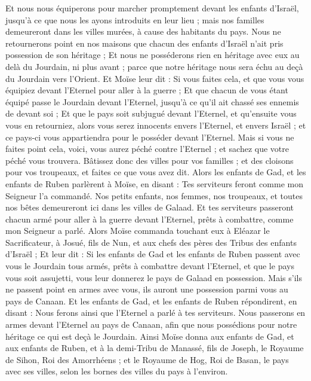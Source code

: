 \begin{multicols}{2}
Et nous nous équiperons pour marcher promptement devant les enfants d'Israël, jusqu'à ce que nous les ayons introduits en leur lieu ; mais nos familles demeureront dans les villes murées, à cause des habitants du pays.
Nous ne retournerons point en nos maisons que chacun des enfants d'Israël n'ait pris possession de son héritage ;
Et nous ne posséderons rien en héritage avec eux au delà du Jourdain, ni plus avant ; parce que notre héritage nous sera échu au deçà du Jourdain vers l'Orient.
Et Moïse leur dit : Si vous faites cela, et que vous vous équipiez devant l'Eternel pour aller à la guerre ;
Et que chacun de vous étant équipé passe le Jourdain devant l'Eternel, jusqu'à ce qu'il ait chassé ses ennemis de devant soi ;
Et que le pays soit subjugué devant l'Eternel, et qu'ensuite vous vous en retourniez, alors vous serez innocents envers l'Eternel, et envers Israël ; et ce pays-ci vous appartiendra pour le posséder devant l'Eternel.
Mais si vous ne faites point cela, voici, vous aurez péché contre l'Eternel ; et sachez que votre péché vous trouvera.
Bâtissez donc des villes pour vos familles ; et des cloisons pour vos troupeaux, et faites ce que vous avez dit.
Alors les enfants de Gad, et les enfants de Ruben parlèrent à Moïse, en disant : Tes serviteurs feront comme mon Seigneur l'a commandé.
Nos petits enfants, nos femmes, nos troupeaux, et toutes nos bêtes demeureront ici dans les villes de Galaad.
Et tes serviteurs passeront chacun armé pour aller à la guerre devant l'Eternel, prêts à combattre, comme mon Seigneur a parlé.
Alors Moïse commanda touchant eux à Eléazar le Sacrificateur, à Josué, fils de Nun, et aux chefs des pères des Tribus des enfants d'Israël ;
Et leur dit : Si les enfants de Gad et les enfants de Ruben passent avec vous le Jourdain tous armés, prêts à combattre devant l'Eternel, et que le pays vous soit assujetti, vous leur donnerez le pays de Galaad en possession.
Mais s'ils ne passent point en armes avec vous, ils auront une possession parmi vous au pays de Canaan.
Et les enfants de Gad, et les enfants de Ruben répondirent, en disant : Nous ferons ainsi que l'Eternel a parlé à tes serviteurs.
Nous passerons en armes devant l'Eternel au pays de Canaan, afin que nous possédions pour notre héritage ce qui est deçà le Jourdain.
Ainsi Moïse donna aux enfants de Gad, et aux enfants de Ruben, et à la demi-Tribu de Manassé, fils de Joseph, le Royaume de Sihon, Roi des Amorrhéens ; et le Royaume de Hog, Roi de Basan, le pays avec ses villes, selon les bornes des villes du pays à l'environ.

\end{multicols}
